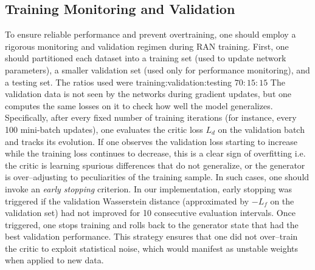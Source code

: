 {{    \subsection{Training Monitoring and Validation}
        To ensure reliable performance and prevent overtraining, one should employ a rigorous monitoring and validation regimen during RAN training.
        First, one should partitioned each dataset into a training set (used to update network parameters), a smaller validation set (used only for performance monitoring), and a testing set.
        The ratios used were training:validation:testing \(70:15:15\)
        The validation data is not seen by the networks during gradient updates, but one computes the same losses on it to check how well the model generalizes.
        Specifically, after every fixed number of training iterations (for instance, every 100 mini-batch updates), one evaluates the critic loss $L_d$ on the validation batch and tracks its evolution.
        If one observes the validation loss starting to increase while the training loss continues to decrease, this is a clear sign of overfitting i.e. the critic is learning spurious differences that do not generalize, or the generator is over--adjusting to peculiarities of the training sample.
        In such cases, one should invoke an \emph{early stopping} criterion.
        In our implementation, early stopping was triggered if the validation Wasserstein distance (approximated by $-L_f$ on the validation set) had not improved for 10 consecutive evaluation intervals.
        Once triggered, one stops training and rolls back to the generator state that had the best validation performance.
        This strategy ensures that one did not over--train the critic to exploit statistical noise, which would manifest as unstable weights when applied to new data.

}}
